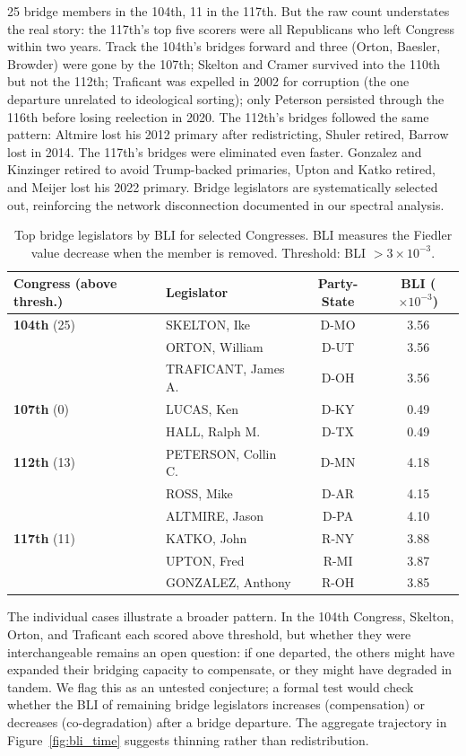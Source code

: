 \documentclass[12pt, a4paper]{article}
\begin{document}
25 bridge members in the 104th, 11 in the 117th. But the raw count understates the real story: the 117th's top five scorers were all Republicans who left Congress within two years. Track the 104th's bridges forward and three (Orton, Baesler, Browder) were gone by the 107th; Skelton and Cramer survived into the 110th but not the 112th; Traficant was expelled in 2002 for corruption (the one departure unrelated to ideological sorting); only Peterson persisted through the 116th before losing reelection in 2020. The 112th's bridges followed the same pattern: Altmire lost his 2012 primary after redistricting, Shuler retired, Barrow lost in 2014. The 117th's bridges were eliminated even faster. Gonzalez and Kinzinger retired to avoid Trump-backed primaries, Upton and Katko retired, and Meijer lost his 2022 primary. Bridge legislators are systematically selected out, reinforcing the network disconnection documented in our spectral analysis.

\begin{table}[H]
\centering
\caption{Top bridge legislators by BLI for selected Congresses. BLI measures the Fiedler value decrease when the member is removed. Threshold: BLI $> 3 \times 10^{-3}$.}
\label{tab:bridge_legislators}
\scriptsize
\begin{tabular}{llcc}
\toprule
Congress (above thresh.) & Legislator & Party-State & BLI ($\times 10^{-3}$) \\
\midrule
\textbf{104th} (25) & SKELTON, Ike & D-MO & 3.56 \\
 & ORTON, William & D-UT & 3.56 \\
 & TRAFICANT, James A. & D-OH & 3.56 \\
\midrule
\textbf{107th} (0) & LUCAS, Ken & D-KY & 0.49 \\
 & HALL, Ralph M. & D-TX & 0.49 \\
\midrule
\textbf{112th} (13) & PETERSON, Collin C. & D-MN & 4.18 \\
 & ROSS, Mike & D-AR & 4.15 \\
 & ALTMIRE, Jason & D-PA & 4.10 \\
\midrule
\textbf{117th} (11) & KATKO, John & R-NY & 3.88 \\
 & UPTON, Fred & R-MI & 3.87 \\
 & GONZALEZ, Anthony & R-OH & 3.85 \\
\bottomrule
\end{tabular}
\end{table}

The individual cases illustrate a broader pattern. In the 104th Congress, Skelton, Orton, and Traficant each scored above threshold, but whether they were interchangeable remains an open question: if one departed, the others might have expanded their bridging capacity to compensate, or they might have degraded in tandem. We flag this as an untested conjecture; a formal test would check whether the BLI of remaining bridge legislators increases (compensation) or decreases (co-degradation) after a bridge departure. The aggregate trajectory in Figure~\ref{fig:bli_time} suggests thinning rather than redistribution.
\end{document}
